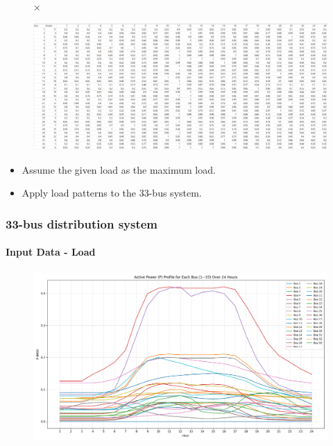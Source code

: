 \documentclass[
	11pt, %
	aspectratio=169, %
]{beamer}
\begin{document}
\begin{frame}
\begin{figure}[h]
\begin{minipage}[c]{0.08\textwidth}
		\end{minipage}
		\hspace{0.02\textwidth}
		\begin{minipage}[c]{0.03\textwidth}
			\centering
			$\times$
		\end{minipage}
		\hspace{0.02\textwidth}
		\begin{minipage}[c]{0.7\textwidth}
			\centering
			\includegraphics[width=\linewidth,keepaspectratio]{load_cluster.png}
		\end{minipage}
	\end{figure}


	
	\begin{itemize}
		\item Assume the given load as the maximum load.
		\item Apply load patterns to the 33-bus system.
	\end{itemize}

\end{frame}



\begin{frame}
	\frametitle{33-bus distribution system}
	\framesubtitle{Input Data - Load}

	\begin{figure}
		\includegraphics[width=4.5 in,keepaspectratio]{../fig/Load_P.png}
	\end{figure}

	
\end{frame}
\end{document}
